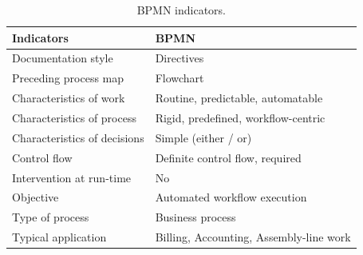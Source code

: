 \begin{table}[]
\centering
\begin{tabular}{@{}ll@{}}
\toprule
Indicators                   & BPMN                                    \\ \midrule
Documentation style          & Directives                              \\
Preceding process map        & Flowchart                               \\
Characteristics of work      & Routine, predictable, automatable       \\
Characteristics of process   & Rigid, predefined, workflow-centric     \\
Characteristics of decisions & Simple (either / or)                    \\
Control flow                 & Definite control flow, required         \\
Intervention at run-time     & No                                      \\
Objective                    & Automated workflow execution            \\
Type of process              & Business process                        \\
Typical application          & Billing, Accounting, Assembly-line work \\ \bottomrule
\end{tabular}
\caption{BPMN indicators.}
\label{tab:bpmnIndicatorsTable}
\end{table}

